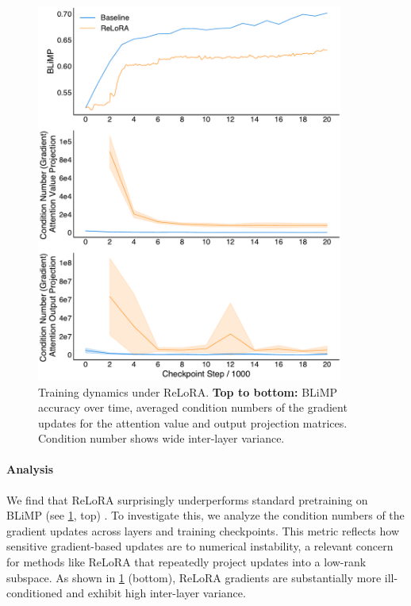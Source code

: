 \begin{figure}[h!]
    \centering
    \includegraphics[width=0.9\textwidth]{chapters/pico/figures/relora-example.pdf}
    \caption{Training dynamics under ReLoRA.
    \textbf{Top to bottom:} BLiMP accuracy over time, averaged condition numbers of the gradient updates for the attention value and output projection matrices. Condition number shows wide inter-layer variance.
    }
    \label{fig:relora_example}
\end{figure}

\paragraph{Analysis} We find that ReLoRA surprisingly underperforms standard pretraining on BLiMP (see \cref{fig:relora_example}, top) \citep{warstadt2020blimp}. To investigate this, we analyze the condition numbers of the gradient updates across layers and training checkpoints. This metric reflects how sensitive gradient-based updates are to numerical instability, a relevant concern for methods like ReLoRA that repeatedly project updates into a low-rank subspace. As shown in \cref{fig:relora_example} (bottom), ReLoRA gradients are substantially more ill-conditioned and exhibit high inter-layer variance. 


